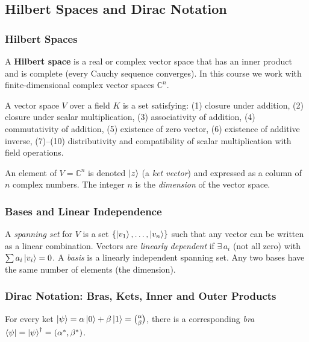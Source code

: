 \documentclass[10pt,a4paper]{article}
\begin{document}
\subsection{Hilbert Spaces and Dirac Notation}

\subsubsection*{Hilbert Spaces}

\begin{tcolorbox}[defstyle, title={Definition: Hilbert Space}]
A \textbf{Hilbert space} is a real or complex vector space that has an inner product and is complete (every Cauchy sequence converges). In this course we work with finite-dimensional complex vector spaces $\mathbb{C}^n$.
\end{tcolorbox}

\begin{tcolorbox}[defstyle, title={Definition: Vector Space}]
A vector space $V$ over a field $K$ is a set satisfying: (1) closure under addition, (2) closure under scalar multiplication, (3) associativity of addition, (4) commutativity of addition, (5) existence of zero vector, (6) existence of additive inverse, (7)--(10) distributivity and compatibility of scalar multiplication with field operations.
\end{tcolorbox}

An element of $V=\mathbb{C}^n$ is denoted $\ket{z}$ (a \emph{ket vector}) and expressed as a column of $n$ complex numbers. The integer $n$ is the \emph{dimension} of the vector space.

\subsubsection*{Bases and Linear Independence}

A \emph{spanning set} for $V$ is a set $\{\ket{v_1},\dots,\ket{v_n}\}$ such that any vector can be written as a linear combination. Vectors are \emph{linearly dependent} if $\exists\, a_i$ (not all zero) with $\sum a_i\ket{v_i}=0$. A \emph{basis} is a linearly independent spanning set. Any two bases have the same number of elements (the dimension).

\subsubsection*{Dirac Notation: Bras, Kets, Inner and Outer Products}

For every ket $\ket{\psi}=\alpha\ket{0}+\beta\ket{1}=\binom{\alpha}{\beta}$, there is a corresponding \emph{bra} $\bra{\psi}=\ket{\psi}^\dagger=(\alpha^*,\beta^*)$.
\end{document}
